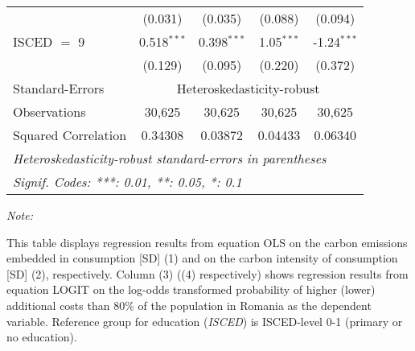 \begin{table}[htbp!]
\begin{adjustbox}{width = 1\textwidth, max height = 0.95\textheight, center}
\begin{threeparttable}[b]
\begin{tabular}{lcccc}
                                 & (0.031)            & (0.035)            & (0.088)        & (0.094)\\   
            ISCED $=$ 9          & 0.518$^{***}$      & 0.398$^{***}$      & 1.05$^{***}$   & -1.24$^{***}$\\   
                                 & (0.129)            & (0.095)            & (0.220)        & (0.372)\\   
            \midrule 
            Standard-Errors & \multicolumn{4}{c}{Heteroskedasticity-robust} \\ 
            Observations         & 30,625             & 30,625             & 30,625         & 30,625\\  
            Squared Correlation  & 0.34308            & 0.03872            & 0.04433        & 0.06340\\  
            \midrule \midrule
            \multicolumn{5}{l}{\emph{Heteroskedasticity-robust standard-errors in parentheses}}\\
            \multicolumn{5}{l}{\emph{Signif. Codes: ***: 0.01, **: 0.05, *: 0.1}}\\
         \end{tabular}
         
         \begin{tablenotes}\item \medskip \textit{Note:}
            \item This table displays regression results from equation OLS on the carbon emissions embedded in consumption [SD] (1) and on the carbon intensity of consumption [SD] (2), respectively. 
                                      Column (3) ((4) respectively) shows regression results from equation LOGIT on the log-odds transformed probability of higher (lower) additional costs than 80\% of the population in Romania as the dependent variable. Reference group for education (\textit{ISCED}) is ISCED-level 0-1 (primary or no education).
         \end{tablenotes}
      \end{threeparttable}
   \end{adjustbox}
\end{table}


